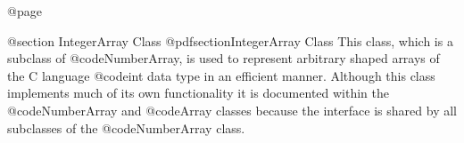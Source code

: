 @page

@section  IntegerArray Class
@pdfsection{IntegerArray Class}
This class, which is a subclass of @code{NumberArray}, is used to
represent arbitrary shaped arrays of the C language @code{int} data type
in an efficient manner.  Although this class implements much of its own
functionality it is documented within the @code{NumberArray} and
@code{Array} classes because the interface is shared by all subclasses
of the @code{NumberArray} class.







